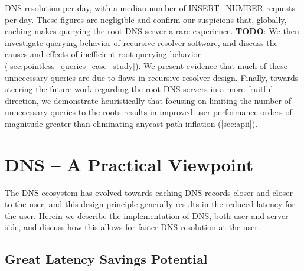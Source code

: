 \documentclass[sigconf,nonacm,10pt]{acmart}
\begin{document}
DNS resolution per day, with a median number of INSERT\_NUMBER requests
per day. These figures are negligible and confirm our suspicions that,
globally, caching makes querying the root DNS server a rare experience.
\textbf{TODO}: We then investigate querying behavior of recursive
resolver software, and discuss the causes and effects of inefficient
root querying behavior (\autoref{sec:pointless_queries_case_study}). We
present evidence that much of these unnecessary queries are due to flaws
in recursive resolver design. Finally, towards steering the future work
regarding the root DNS servers in a more fruitful direction, we
demonstrate heuristically that focusing on limiting the number of
unnecessary queries to the roots results in improved user performance
orders of magnitude greater than eliminating anycast path inflation
(\autoref{sec:apii}).

\section{DNS -- A Practical
Viewpoint}\label{dns-a-practical-viewpoint-1}

\label{sec:dns_practical_viewpoint} The DNS ecosystem has evolved
towards caching DNS records closer and closer to the user, and this
design principle generally results in the reduced latency for the user.
Herein we describe the implementation of DNS, both user and server side,
and discuss how this allows for faster DNS resolution at the user.

\subsection{Great Latency Savings
Potential}\label{great-latency-savings-potential-1}
\end{document}
